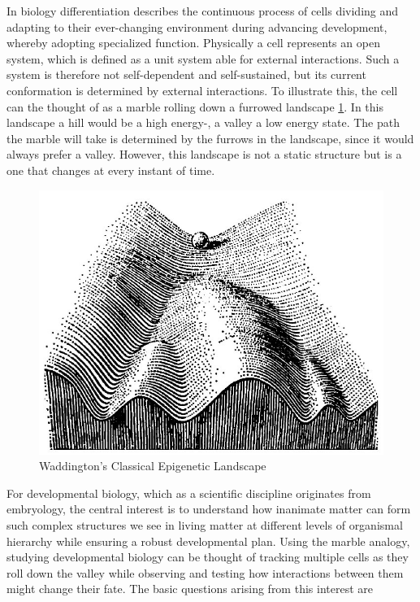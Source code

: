 \documentclass[11pt,singlespacinge,twoside]{reedthesis} %
\begin{document}
In biology differentiation describes the continuous process of cells dividing and adapting to their ever-changing environment during advancing development, whereby adopting specialized function. Physically a cell represents an open system, which is defined as a unit system able for external interactions. Such a system is therefore not self-dependent and self-sustained, but its current conformation is determined by external interactions. To illustrate this, the cell can the thought of as a marble rolling down a furrowed landscape \ref{fig:wadd}. In this landscape a hill would be a high energy-, a valley a low energy state. The path the marble will take is determined by the furrows in the landscape, since it would always prefer a valley. However, this landscape is not a static structure but is a one that changes at every instant of time.
\begin{figure}

{\centering \includegraphics{figures/intro/waddington} 

}

\caption{Waddington's Classical Epigenetic Landscape}\label{fig:wadd}
\end{figure}
For developmental biology, which as a scientific discipline originates from embryology, the central interest is to understand how inanimate matter can form such complex structures we see in living matter at different levels of organismal hierarchy while ensuring a robust developmental plan. Using the marble analogy, studying developmental biology can be thought of tracking multiple cells as they roll down the valley while observing and testing how interactions between them might change their fate. The basic questions arising from this interest are
\end{document}
